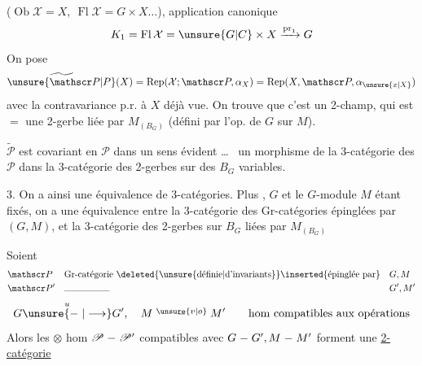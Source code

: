 ($\operatorname{Ob}\mathcal X=X,\ \operatorname{Fl}\mathcal X=G\times X\ldots$), application canonique
\[
K_1=\operatorname{Fl}\mathcal X=\unsure{G|C}\times X\xrightarrow{\mathrm{pr}_1}G
\]
On pose
\[
\widetilde{\unsure{\mathscr P|P}}(X)=\operatorname{Rep}(\mathcal X;\mathscr P,\alpha_X)=\operatorname{Rep}(X,\mathscr P,\alpha_{\unsure{x|X}})
\]
avec la contravariance p.r. à $X$ déjà vue. On trouve que c'est un 2-champ, qui est $=$ une 2-gerbe liée par $M_{(B_G)}$  (défini par l'op. de $G$ sur $M$).

 \uline{} $\widetilde{\mathscr P}$ est covariant en $\mathscr P$ dans un sens évident \ldots\  un morphisme de la 3-catégorie des  $\mathscr P$ dans la 3-catégorie des 2-gerbes sur des $B_G$ variables.

3. On a ainsi une équivalence de 3-catégories. Plus , $G$ et le $G$-module $M$ étant fixés, on a une équivalence entre la 3-catégorie des Gr-catégories  épinglées par $(G,M)$, et la 3-catégorie des 2-gerbes sur $B_G$ liées par $M_{(B_G)}$

Soient
\[
\begin{aligned}
&\mathscr P &&\text{Gr-catégorie }\deleted{\unsure{\text{définie}|\text{d'invariants}}}\inserted{\text{épinglée par}} &&G,M\\
&\mathscr P' &&\rule{5em}{.3pt} &&G',M'
\end{aligned}
\]
\[
G\overset{u}{\unsure{\relbar|\longrightarrow}}G',\quad M\overset{\unsure{v|o}}{\relbar}M'\qquad\text{hom compatibles aux opérations}
\]
Alors les $\otimes$ hom $\mathscr P\relbar\mathscr P'$ compatibles avec $G\relbar G', M\relbar M'$ forment une \uline{2-catégorie}
